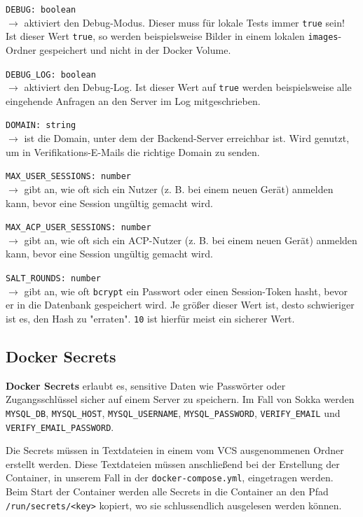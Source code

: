 \lstinline{DEBUG: boolean} \\
$\rightarrow$ aktiviert den Debug-Modus. Dieser muss für lokale Tests immer \lstinline{true} sein! Ist dieser Wert \lstinline{true}, so werden beispielsweise Bilder in einem lokalen \lstinline{images}-Ordner gespeichert und nicht in der Docker Volume.

\lstinline{DEBUG_LOG: boolean} \\
$\rightarrow$ aktiviert den Debug-Log. Ist dieser Wert auf \lstinline{true} werden beispielsweise alle eingehende Anfragen an den Server im Log mitgeschrieben.

\lstinline{DOMAIN: string} \\
$\rightarrow$ ist die Domain, unter dem der Backend-Server erreichbar ist. Wird genutzt, um in Verifikations-E-Mails die richtige Domain zu senden.

\lstinline{MAX_USER_SESSIONS: number} \\
$\rightarrow$ gibt an, wie oft sich ein Nutzer (z. B. bei einem neuen Gerät) anmelden kann, bevor eine Session ungültig gemacht wird.

\lstinline{MAX_ACP_USER_SESSIONS: number} \\
$\rightarrow$ gibt an, wie oft sich ein ACP-Nutzer (z. B. bei einem neuen Gerät) anmelden kann, bevor eine Session ungültig gemacht wird.

\lstinline{SALT_ROUNDS: number} \\
$\rightarrow$ gibt an, wie oft \lstinline{bcrypt} ein Passwort oder einen Session-Token hasht, bevor er in die Datenbank gespeichert wird. Je größer dieser Wert ist, desto schwieriger ist es, den Hash zu "erraten". \lstinline{10} ist hierfür meist ein sicherer Wert. \cite{stoeckli2017}

\subsection{Docker Secrets}
\label{dockersecrets}

\textbf{Docker Secrets} erlaubt es, sensitive Daten wie Passwörter oder Zugangsschlüssel sicher auf einem Server zu speichern. Im Fall von Sokka werden \lstinline{MYSQL_DB}, \lstinline{MYSQL_HOST}, \lstinline{MYSQL_USERNAME}, \lstinline{MYSQL_PASSWORD}, \lstinline{VERIFY_EMAIL} und \lstinline{VERIFY_EMAIL_PASSWORD}. 

Die Secrets müssen in Textdateien in einem vom VCS ausgenommenen Ordner erstellt werden. Diese Textdateien müssen anschließend bei der Erstellung der Container, in unserem Fall in der \lstinline{docker-compose.yml}, eingetragen werden. Beim Start der Container werden alle Secrets in die Container an den Pfad \lstinline{/run/secrets/<key>} kopiert, wo sie schlussendlich ausgelesen werden können.

